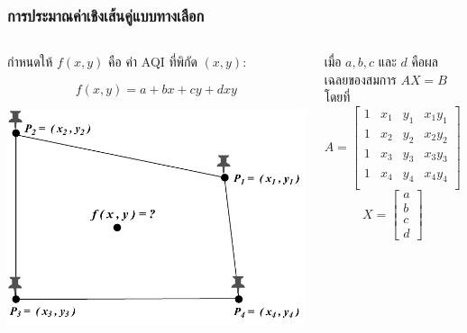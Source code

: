 \documentclass[12pt,aspectratio=169]{beamer}
\begin{document}
    \begin{frame}
        \frametitle{การประมาณค่าเชิงเส้นคู่แบบทางเลือก}
        \begin{columns}
            \begin{column}{0.5\textwidth}
            กำหนดให้ $f(x,y)$ คือ ค่า AQI ที่พิกัด $(x,y)$:
            \begin{block}{}
              \[
                    f(x,y)=a+bx+cy+dxy
               \]   
            \end{block}

               \begin{center}
                   \includegraphics[width=\textwidth]{img/region-selection-one-point.pdf}
               \end{center}
            \end{column}
            \begin{column}{0.4\textwidth}  
            เมื่อ $a,b,c$ และ $d$ คือผลเฉลยของสมการ $AX = B$  โดยที่              
            \[
               A
               =\begin{bmatrix}
               1 & x_1 & y_1 & x_1y_1\\
               1 & x_2 & y_2 & x_2y_2\\
               1 & x_3 & y_3 & x_3y_3\\
               1 & x_4 & y_4 & x_4y_4\\
               \end{bmatrix},
        \]
        \[
               X = \begin{bmatrix}
                  a \\ b \\ c \\ d

\end{bmatrix}\]
\end{column}
\end{columns}
\end{frame}
\end{document}
